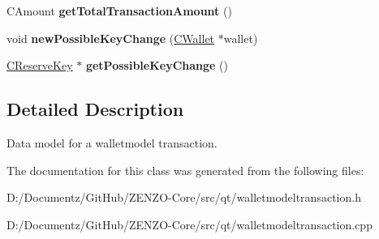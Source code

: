\begin{DoxyCompactItemize}
C\+Amount {\bfseries get\+Total\+Transaction\+Amount} ()
\item 
\mbox{\label{class_wallet_model_transaction_af6e3adde528f4578145be97699c45bb8}} 
void {\bfseries new\+Possible\+Key\+Change} (\mbox{\hyperlink{class_c_wallet}{C\+Wallet}} $\ast$wallet)
\item 
\mbox{\label{class_wallet_model_transaction_a58835446dab9397f823106d4a6ba6812}} 
\mbox{\hyperlink{class_c_reserve_key}{C\+Reserve\+Key}} $\ast$ {\bfseries get\+Possible\+Key\+Change} ()
\end{DoxyCompactItemize}


\subsection{Detailed Description}
Data model for a walletmodel transaction. 

The documentation for this class was generated from the following files\+:\begin{DoxyCompactItemize}
\item 
D\+:/\+Documentz/\+Git\+Hub/\+Z\+E\+N\+Z\+O-\/\+Core/src/qt/walletmodeltransaction.\+h\item 
D\+:/\+Documentz/\+Git\+Hub/\+Z\+E\+N\+Z\+O-\/\+Core/src/qt/walletmodeltransaction.\+cpp\end{DoxyCompactItemize}
